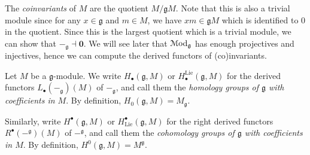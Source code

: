 The \emph{coinvariants} of $M$ are the quotient $M/\mathfrak{g} M$. Note that this is also a trivial module since for any $x\in \mathfrak{g} $ and $m\in M$, we have $xm\in \mathfrak{g} M$ which is identified to 0 in the quotient. Since this is the largest quotient which is a trivial module, we can show that $-_\mathfrak{g} \dashv \mathbf{0} $. We will see later that $\mathcal{M}\mathrm{od} _\mathfrak{g} $ has enough projectives and injectives, hence we can compute the derived functors of (co)invariants.

\begin{definition}\label{7.2.5}
	Let $M$ be a $\mathfrak{g} $-module. We write $H_{\bullet} (\mathfrak{g},M)$ or $H_{\bullet} ^{\mathrm{Lie} } (\mathfrak{g} ,M)$ for the derived functors $L_{\bullet} (-_\mathfrak{g} )(M)$ of $-_\mathfrak{g} $, and call them the \emph{homology groups of $\mathfrak{g} $ with coefficients in $M$}. By definition, $H_0(\mathfrak{g} ,M)=M_\mathfrak{g} $.

	Similarly, write $H^{\bullet} (\mathfrak{g},M)$ or $H^{\bullet} _{\mathrm{Lie} } (\mathfrak{g} ,M)$ for the right derived functors $R^{\bullet} (-^{\mathfrak{g} } )(M)$ of $-^{\mathfrak{g} } $, and call them the \emph{cohomology groups of $\mathfrak{g} $ with coefficients in $M$}. By definition, $H^0(\mathfrak{g} ,M)=M^\mathfrak{g} $.
\end{definition}

